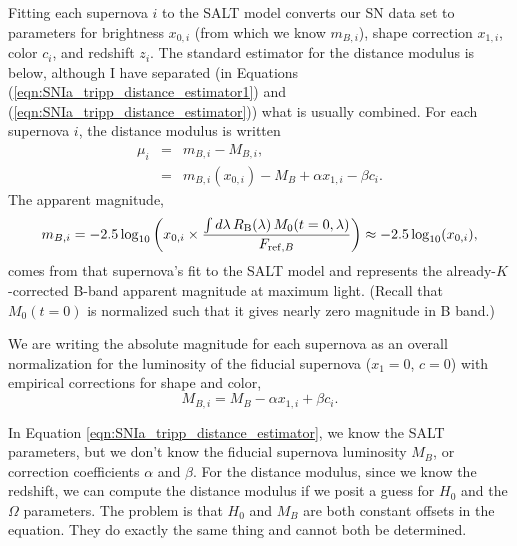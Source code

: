 Fitting each supernova $i$ to the SALT model converts our SN data set to parameters for brightness $x_{0,i}$ (from which we know $m_{B,i}$), shape correction $x_{1,i}$, color $c_{i}$, and redshift $z_i$.  The  standard estimator for the distance modulus \citep{1998A&A...331..815T} is below, although I have separated (in Equations (\ref{eqn:SNIa_tripp_distance_estimator1}) and (\ref{eqn:SNIa_tripp_distance_estimator})) what is usually combined.  For each supernova $i$, the distance modulus is written
\begin{eqnarray}
  \mu_i &=& m_{B,i} - M_{B,i}, \label{eqn:SNIa_tripp_distance_estimator1}  \\
  &=&  m_{B,i}(x_{0,i}) -  {M}_B + \alpha x_{1,i} - \beta c_i.\label{eqn:SNIa_tripp_distance_estimator}
\end{eqnarray}
The apparent magnitude,
\begin{equation}
m_{B,i} = -2.5 \log_{10} \left(x_{0,i} \times \frac{\int d\lambda\, R_{\rm B}(\lambda)\, M_0(t=0,\lambda)}{F_{{\rm ref},B}} \right) \approx -2.5 \log_{10} (x_{0,i}),
\end{equation}
comes from that supernova's fit to the SALT model and represents the already-$K$-corrected B-band apparent magnitude at maximum light. (Recall that $M_0(t=0)$ is normalized such that it gives nearly zero magnitude in B band.)

We are writing the absolute magnitude for each supernova as an overall normalization for the luminosity of the fiducial supernova ($x_1 = 0$, $c = 0$) with empirical corrections for shape and color,
\begin{equation}
  M_{B,i} =  {M}_B - \alpha x_{1,i} + \beta c_i.  \label{eqn:SNIa_tripp_distance_estimator2}
\end{equation}

In Equation \ref{eqn:SNIa_tripp_distance_estimator}, we know the SALT parameters, but we don't know the fiducial supernova luminosity ${M}_B$, or correction coefficients $\alpha$ and $\beta$.  For the distance modulus, since we know the redshift, we can compute the distance modulus if we posit a guess for $H_0$ and the $\Omega$ parameters.  The problem is that $H_0$ and $M_B$ are both constant offsets in the equation.  They do exactly the same thing and cannot both be determined.


